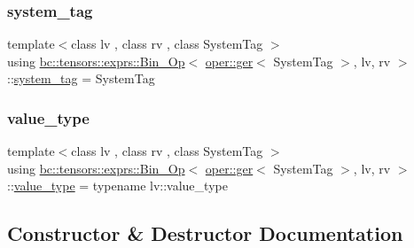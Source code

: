\subsubsection{\texorpdfstring{system\+\_\+tag}{system\_tag}}
{\footnotesize\ttfamily template$<$class lv , class rv , class System\+Tag $>$ \\
using \hyperlink{structbc_1_1tensors_1_1exprs_1_1Bin__Op}{bc\+::tensors\+::exprs\+::\+Bin\+\_\+\+Op}$<$ \hyperlink{structbc_1_1oper_1_1ger}{oper\+::ger}$<$ System\+Tag $>$, lv, rv $>$\+::\hyperlink{structbc_1_1tensors_1_1exprs_1_1Bin__Op_3_01oper_1_1ger_3_01SystemTag_01_4_00_01lv_00_01rv_01_4_abcd305e8f31931d98bc3cbd42833b73d}{system\+\_\+tag} =  System\+Tag}

\mbox{\label{structbc_1_1tensors_1_1exprs_1_1Bin__Op_3_01oper_1_1ger_3_01SystemTag_01_4_00_01lv_00_01rv_01_4_a1e724bc99333d1b22f1ce67c3559620b}} 
\subsubsection{\texorpdfstring{value\+\_\+type}{value\_type}}
{\footnotesize\ttfamily template$<$class lv , class rv , class System\+Tag $>$ \\
using \hyperlink{structbc_1_1tensors_1_1exprs_1_1Bin__Op}{bc\+::tensors\+::exprs\+::\+Bin\+\_\+\+Op}$<$ \hyperlink{structbc_1_1oper_1_1ger}{oper\+::ger}$<$ System\+Tag $>$, lv, rv $>$\+::\hyperlink{structbc_1_1tensors_1_1exprs_1_1Bin__Op_3_01oper_1_1ger_3_01SystemTag_01_4_00_01lv_00_01rv_01_4_a1e724bc99333d1b22f1ce67c3559620b}{value\+\_\+type} =  typename lv\+::value\+\_\+type}



\subsection{Constructor \& Destructor Documentation}
\mbox{\label{structbc_1_1tensors_1_1exprs_1_1Bin__Op_3_01oper_1_1ger_3_01SystemTag_01_4_00_01lv_00_01rv_01_4_ad3441252cab02823f05fad5bc2731ee2}} 
